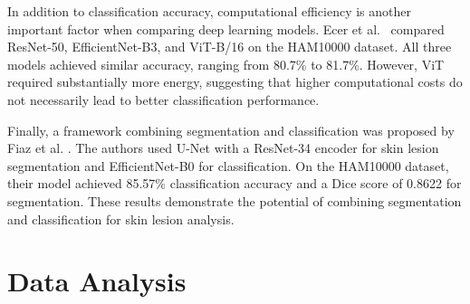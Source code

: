 \documentclass[conference]{IEEEtran}
\begin{document}
In addition to classification accuracy,
computational efficiency is another important
factor when comparing deep learning models.
Ecer et al.~\cite{b7} compared ResNet-50,
EfficientNet-B3, and ViT-B/16 on the HAM10000
dataset. All three models achieved similar
accuracy, ranging from 80.7\% to 81.7\%.
However, ViT required substantially more energy,
suggesting that higher computational costs
do not necessarily lead to better classification
performance.

Finally, a framework combining segmentation
and classification was proposed by Fiaz et al.
\cite{b8}. The authors used U-Net with a
ResNet-34 encoder for skin lesion segmentation
and EfficientNet-B0 for classification.
On the HAM10000 dataset, their model achieved
85.57\% classification accuracy and a Dice
score of 0.8622 for segmentation. These results
demonstrate the potential of combining
segmentation and classification for skin
lesion analysis.


\section{Data Analysis}\label{sec:data}

\end{document}
